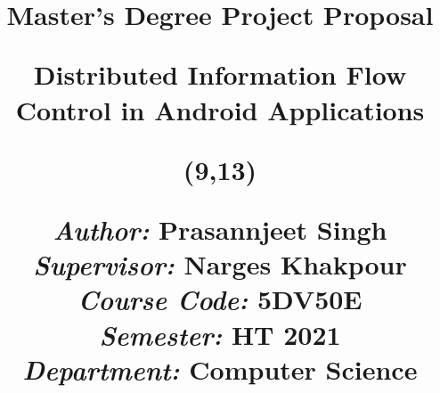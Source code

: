 \title{	
	\vspace{-8cm}
	\begin{sidebar}
		\vspace{10cm}
		\normalfont \normalsize
		\Huge Master's Degree Project Proposal \\
		\vspace{-1.3cm}
	\end{sidebar}
	\vspace{3cm}
	\begin{flushleft}
		\huge Distributed Information Flow Control in Android Applications\\ 
	\end{flushleft}
	\null
	\vfill
	\begin{textblock}{6}(9,13)
		\begin{flushright}
			\begin{minipage}{\textwidth}
				\begin{flushleft} \large
					\emph{Author:} Prasannjeet Singh\\ %
					\emph{Supervisor:} Narges Khakpour\\ %
					\emph{Course Code:} 5DV50E\\
					\emph{Semester:} HT 2021\\ %
					\emph{Department:} Computer Science\\ %
				\end{flushleft}
			\end{minipage}
		\end{flushright}
	\end{textblock}
}

\date{} 